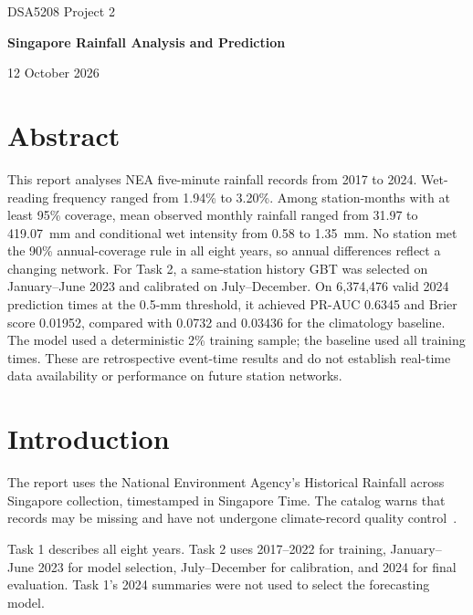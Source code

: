\documentclass[11pt,a4paper]{article}
\newcommand{\projecttitle}{Singapore Rainfall Analysis and Prediction}
\begin{document}
\hypersetup{pageanchor=false}
\begin{titlepage}
  \centering
  \vspace*{35mm}
  {\Large DSA5208 Project 2\par}
  \vspace{10mm}
  {\LARGE\bfseries \projecttitle\par}
  \vfill
  \vspace{15mm}
  {\large 12 October 2026\par}
\end{titlepage}

\hypersetup{pageanchor=true}
\section*{Abstract}
This report analyses NEA five-minute rainfall records from 2017 to 2024. Wet-
reading frequency ranged from 1.94\% to 3.20\%. Among station-months with at
least 95\% coverage, mean observed monthly rainfall ranged from 31.97 to
419.07~mm and conditional wet intensity from 0.58 to 1.35~mm. No station met
the 90\% annual-coverage rule in all eight years, so annual differences reflect
a changing network. For Task 2, a same-station history GBT was selected on
January--June 2023 and calibrated on July--December. On 6,374,476 valid 2024
prediction times at the 0.5-mm threshold, it achieved PR-AUC 0.6345 and Brier
score 0.01952, compared with 0.0732 and 0.03436 for the climatology baseline.
The model used a deterministic 2\% training sample; the baseline used all
training times. These are retrospective event-time results and do not establish
real-time data availability or performance on future station networks.

\tableofcontents
\clearpage
{}

\section{Introduction}
The report uses the National Environment Agency's Historical Rainfall across
Singapore collection, timestamped in Singapore Time. The catalog warns that
records may be missing and have not undergone climate-record quality control~\cite{nea}.

Task 1 describes all eight years. Task 2 uses 2017--2022 for training,
January--June 2023 for model selection, July--December for calibration, and
2024 for final evaluation. Task 1's 2024 summaries were not used to select the
forecasting model.
\end{document}
